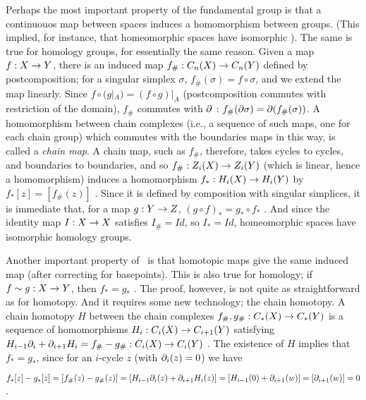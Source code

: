 \msk

Perhaps the most important property of the fundamental group is that a continuouos map 
between spaces induces a homomorphism between groups. (This implied, for instance,
that homeomorphic spaces have isomorphic \mpu ). The same is true for homology groups, 
for essentially the same reason. Given a map $f:X\rightarrow Y$, there is an induced map $f_\#:C_n(X)\rightarrow C_n(Y)$
defined by postcomposition; for a singular simplex $\sigma$, $f_\#(\sigma) = f\circ\sigma$, and we extend
the map linearly. Since $f\circ(g|_A) = (f\circ g)|_A$ (postcomposition commutes with restriction of the domain),
$f_\#$ commutes with $\partial$ : $f_\#(\partial \sigma) = \partial(f_\#(\sigma))$. A homomorphism between
chain complexes (i.e., a sequence of such maps, one for each chain group) which commutes with the 
boundaries maps in this way, is called a {\it chain map}.
A chain map, such as $f_\#$, therefore, takes cycles to cycles,
and boundaries to boundaries, and so $f_\#:Z_i(X)\rightarrow Z_i(Y)$ (which is linear, hence a homomorphism)
induces a homomorphism $f_*:H_i(X)\rightarrow H_i(Y)$ by $f_*[z] = [f_\#(z)]$ . 
Since it is defined by composition with singular simplices, it is 
immediate that, for a map $g:Y\rightarrow Z$, $(g\circ f)_*=g_*\circ f_*$ . And since the identity map $I:X\rightarrow X$
satisfies $I_\#=Id$, so $I_*=Id$, homeomorphic spaces have isomorphic homology groups.

\msk

Another important property of \mpu\ is that homotopic maps give the same
induced map (after correcting for basepoints). This is also true for homology;
if $f\sim g:X\rightarrow Y$, then $f_*=g_*$ . The proof, however, is not quite as straightforward
as for homotopy. And it requires some new technology; the chain homotopy.
A chain homotopy $H$ between the chain complexes $f_\#,g_\#:C_*(X)\rightarrow C_*(Y)$ 
is a sequence of homomorphisms $H_i:C_i(X)\rightarrow C_{i+1}(Y)$ satisfying
$H_{i-1}\partial_i+\partial_{i+1}H_i = f_\#-g_\#:C_i(X)\rightarrow C_i(Y)$ . The existence of $H$
implies that $f_*=g_*$, since for an $i$-cycle $z$ (with $\partial_i(z)=0$) we have

$f_*[z]-g_*[z] = [f_\#(z)-g_\#(z)] = [H_{i-1}\partial_i(z)+\partial_{i+1}H_i(z)] = [H_{i-1}(0)+\partial_{i+1}(w)]
=[\partial_{i+1}(w)]=0$.

